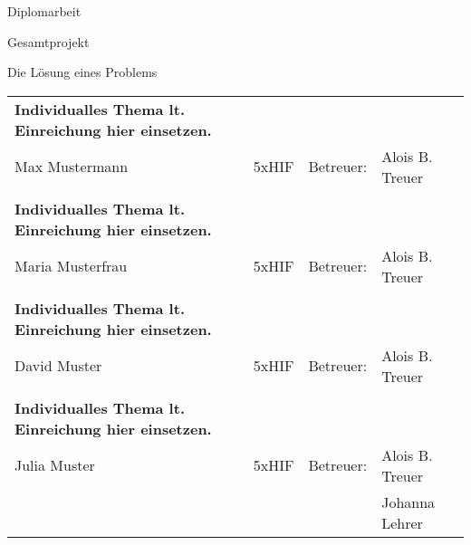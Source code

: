 \documentclass[letterpaper,10pt]{article}
\begin{document}
\setlength{\headheight}{14pt}
\setlength{\hsize}{0.9\hsize}%

\pagestyle{fancy}
%        



\begin{center}
    \Huge{Diplomarbeit} \\
    
\end{center}
\begin{center}   
Gesamtprojekt

\end{center}

\begin{center}
    \huge{Die Lösung eines Problems}
\end{center}



\raggedright{
    \begin{tabular}{l l l l} 
        \textbf{Individualles Thema lt. Einreichung hier einsetzen.} & & & \\
        Max Mustermann & 5xHIF & Betreuer: & Alois B. Treuer \\ 
        \\
        \textbf{Individualles Thema lt. Einreichung hier einsetzen.} & & & \\
        Maria Musterfrau & 5xHIF & Betreuer: & Alois B. Treuer \\ 
        \\
        \textbf{Individualles Thema lt. Einreichung hier einsetzen.} & & & \\
        David Muster & 5xHIF & Betreuer: & Alois B. Treuer \\ 

        \\
        \textbf{Individualles Thema lt. Einreichung hier einsetzen.} & & & \\
        Julia Muster & 5xHIF & Betreuer: & Alois B. Treuer \\ 
        &&& Johanna Lehrer
    \end{tabular}

}
\end{document}
